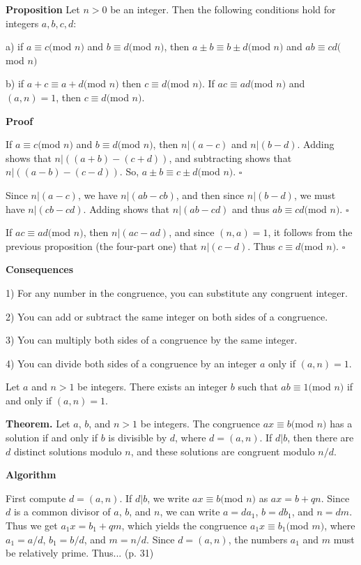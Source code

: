 \documentclass[12pt]{article}
\renewcommand{\mod}{$mod $}
\begin{document}
\textbf{Proposition} Let $n > 0$ be an integer. Then the following conditions hold for integers $a, b, c, d$:

a) if $a \equiv c (\mod n)$ and $b \equiv d (\mod n)$, then $a \pm b \equiv b \pm d (\mod n)$ and $ab \equiv cd (\mod n)$

b) if $a + c \equiv a + d (\mod n)$ then $c \equiv d (\mod n)$. If $ac \equiv ad (\mod n)$ and $(a,n) = 1$, then $c \equiv d (\mod n)$.

\textbf{Proof}

If $a \equiv c(\mod n)$ and $b \equiv d(\mod n)$, then $n|(a-c)$ and $n|(b-d)$. Adding shows that $n|((a+b)-(c+d))$, and subtracting shows that $n|((a-b)-(c-d))$. So, $a \pm b \equiv c \pm d (\mod n)$. $\square$

Since $n|(a-c)$, we have $n|(ab-cb)$, and then since $n|(b-d)$, we must have $n|(cb-cd)$. Adding shows that $n|(ab-cd)$ and thus $ab \equiv cd(\mod n)$. $\square$

If $ac \equiv ad (\mod n)$, then $n|(ac-ad)$, and since $(n,a)=1$, it follows from the previous proposition (the four-part one) that $n|(c-d)$. Thus $c \equiv d(\mod n)$. $\square$

\textbf{Consequences}

1) For any number in the congruence, you can substitute any congruent integer.

2) You can add or subtract the same integer on both sides of a congruence.

3) You can multiply both sides of a congruence by the same integer.

4) You can divide both sides of a congruence by an integer $a$ only if $(a,n) = 1$.

Let $a$ and $n > 1$ be integers. There exists an integer $b$ such that $ab \equiv 1 (\mod n)$ if and only if $(a,n) = 1$.

\textbf{Theorem.} Let $a$, $b$, and $n > 1$ be integers. The congruence $ax \equiv b (\mod n)$ has a solution if and only if $b$ is divisible by $d$, where $d = (a,n)$. If $d|b$, then there are $d$ distinct solutions modulo $n$, and these solutions are congruent modulo $n/d$.

\textbf{Algorithm}

First compute $d = (a,n)$. If $d | b$, we write $ax \equiv b(\mod n)$ as $ax = b + qn$. Since $d$ is a common divisor of $a$, $b$, and $n$, we can write $a = da_{1}$, $b = db_{1}$, and $n = dm$. Thus we get $a_{1}x = b_{1}+qm$, which yields the congruence $a_{1}x \equiv b_{1}(\mod m)$, where $a_{1} = a/d$, $b_{1} = b/d$, and $m = n/d$.
Since $d = (a,n)$, the numbers $a_{1}$ and $m$ must be relatively prime. Thus... (p. 31)
\end{document}
